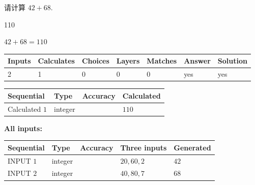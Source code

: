 \documentclass{ctexart}
\begin{document}
  
 
请计算 $ %
42 +  %
68 $.
 
 
 
\noindent{}
 
 

110
 
 
\noindent{}
 
 

 
 
 
\noindent{}
 
 

$ %
42 +  %
68=   %
110$
 
 
\noindent{}
 
 

 
   
   
   
   
\noindent\begin{tabular}{|l|l|l|l|l|l|l|}
 \hline
Inputs & Calculates & Choices & Layers & Matches & Answer & Solution \\ \hline
 2  & 
 1  & 
 0
  & 
 0  & 
 0  & 
  yes & 
  yes 
  \\ \hline
 \end{tabular}
   
   
   
   
\noindent{}
   
   
  
  
\noindent\begin{tabular}{|l|l|l|l|}
\hline
 Sequential & Type & Accuracy & Calculated \\ 
\hline
 
 
  Calculated $  1 $ & integer &  & 
  $ 110 $ 
 \\  \hline  
 \end{tabular}
   
   
   
   
\noindent\vspace{0.1in}\hspace{-0.08in} {\textbf{\Large{All inputs: }}}
   
   
  
  
\noindent\begin{tabular}{|l|l|l|l|l|}
\hline
 Sequential & Type & Accuracy & Three inputs & Generated \\ 
\hline
 
 
  INPUT $  1 $ & integer &  & $
 20
 , 
 60
 , 
 2
 $ & $ 42 $ 
 \\  \hline  
 
 
  INPUT $  2 $ & integer &  & $
 40
 , 
 80
 , 
 7
 $ & $ 68 $ 
 \\  \hline  
 \end{tabular}
   
\end{document}
